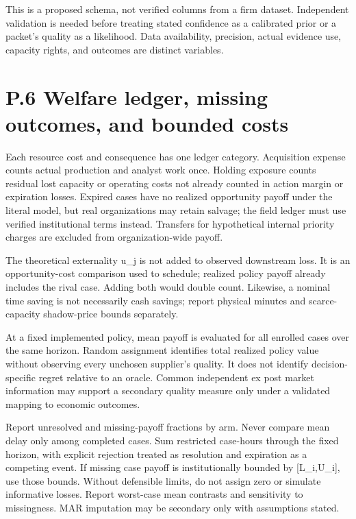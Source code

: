 \documentclass[
  11pt,
]{article}
\begin{document}
This is a proposed schema, not verified columns from a firm dataset.
Independent validation is needed before treating stated confidence as a
calibrated prior or a packet's quality as a likelihood. Data
availability, precision, actual evidence use, capacity rights, and
outcomes are distinct variables.

\section{P.6 Welfare ledger, missing outcomes, and bounded
costs}\label{p.6-welfare-ledger-missing-outcomes-and-bounded-costs}

Each resource cost and consequence has one ledger category. Acquisition
expense counts actual production and analyst work once. Holding exposure
counts residual lost capacity or operating costs not already counted in
action margin or expiration losses. Expired cases have no realized
opportunity payoff under the literal model, but real organizations may
retain salvage; the field ledger must use verified institutional terms
instead. Transfers for hypothetical internal priority charges are
excluded from organization-wide payoff.

The theoretical externality u\_j is not added to observed downstream
loss. It is an opportunity-cost comparison used to schedule; realized
policy payoff already includes the rival case. Adding both would double
count. Likewise, a nominal time saving is not necessarily cash savings;
report physical minutes and scarce-capacity shadow-price bounds
separately.

At a fixed implemented policy, mean payoff is evaluated for all enrolled
cases over the same horizon. Random assignment identifies total realized
policy value without observing every unchosen supplier's quality. It
does not identify decision-specific regret relative to an oracle. Common
independent ex post market information may support a secondary quality
measure only under a validated mapping to economic outcomes.

Report unresolved and missing-payoff fractions by arm. Never compare
mean delay only among completed cases. Sum restricted case-hours through
the fixed horizon, with explicit rejection treated as resolution and
expiration as a competing event. If missing case payoff is
institutionally bounded by {[}L\_i,U\_i{]}, use those bounds. Without
defensible limits, do not assign zero or simulate informative losses.
Report worst-case mean contrasts and sensitivity to missingness. MAR
imputation may be secondary only with assumptions stated.
\end{document}
